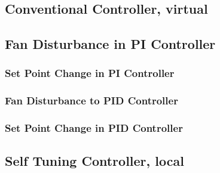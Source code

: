 \subsection{Conventional Controller, virtual}\label{convcode_virtual}
\subsection{Fan Disturbance in PI Controller}
\begin{code}

\end{code}


\subsubsection{Set Point Change in PI Controller}
\begin{code}

\end{code}



\subsubsection{Fan Disturbance to PID Controller}
\begin{code}

\end{code}


\subsubsection{Set Point Change in PID Controller}
\begin{code}

\end{code}



\subsection{Self Tuning Controller, local}\label{selfcode_virtual}
